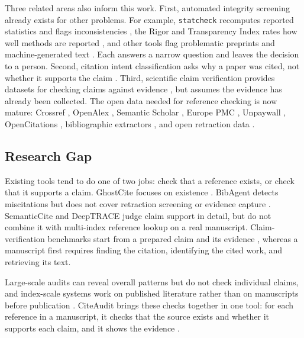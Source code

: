 \documentclass{article}
\begin{document}
Three related areas also inform this work. First, automated integrity screening already exists for other problems. For example, \texttt{statcheck} recomputes reported statistics and flags inconsistencies \cite{nuijten2016,nuijten2020}, the Rigor and Transparency Index rates how well methods are reported \cite{menke2020}, and other tools flag problematic preprints \cite{weissgerber2021} and machine-generated text \cite{cabanac2021tort,cabanac2021prev}. Each answers a narrow question and leaves the decision to a person. Second, citation intent classification asks why a paper was cited, not whether it supports the claim \cite{cohan2019,jurgens2018}. Third, scientific claim verification provides datasets for checking claims against evidence \cite{thorne2018,wadden2020,vladika2023}, but assumes the evidence has already been collected. The open data needed for reference checking is now mature: Crossref \cite{hendricks2020}, OpenAlex \cite{priem2022}, Semantic Scholar \cite{kinney2023}, Europe PMC \cite{europepmc2015}, Unpaywall \cite{piwowar2018}, OpenCitations \cite{peroni2020}, bibliographic extractors \cite{lopez2009,tkaczyk2015}, and open retraction data \cite{crossref2023,cope2019}.

\subsection{Research Gap}

Existing tools tend to do one of two jobs: check that a reference exists, or check that it supports a claim. GhostCite focuses on existence \cite{ref9}. BibAgent detects miscitations but does not cover retraction screening or evidence capture \cite{ref1}. SemanticCite \cite{ref2} and DeepTRACE \cite{ref8} judge claim support in detail, but do not combine it with multi-index reference lookup on a real manuscript. Claim-verification benchmarks start from a prepared claim and its evidence \cite{thorne2018,wadden2020,vladika2023}, whereas a manuscript first requires finding the citation, identifying the cited work, and retrieving its text.

Large-scale audits \cite{ref3,ref5,ref6,nuijten2020,menke2020} can reveal overall patterns but do not check individual claims, and index-scale systems work on published literature rather than on manuscripts before publication \cite{nicholson2021,peroni2020}. CiteAudit brings these checks together in one tool: for each reference in a manuscript, it checks that the source exists and whether it supports each claim, and it shows the evidence \cite{ref4}.
\end{document}

